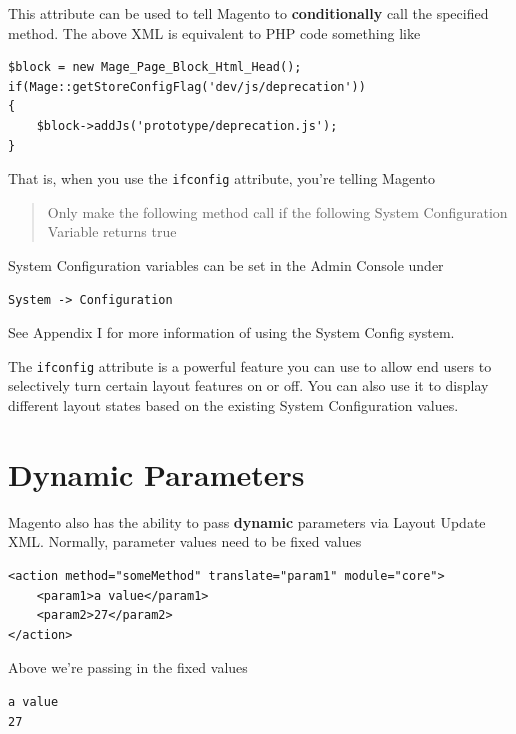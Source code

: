 \documentclass[oneside]{book}
\begin{document}
This attribute can be used to tell Magento to \textbf{conditionally} call the specified method. The above XML is equivalent to PHP code something like

\begin{lstlisting}
$block = new Mage_Page_Block_Html_Head();
if(Mage::getStoreConfigFlag('dev/js/deprecation'))
{
    $block->addJs('prototype/deprecation.js');
}

\end{lstlisting}


That is, when you use the \footnotesize\texttt{ifconfig} \normalsize  attribute, you're telling Magento

\begin{quote}
Only make the following method call if the following System Configuration Variable returns true
\end{quote}

System Configuration variables can be set in the Admin Console under

\begin{lstlisting}
System -> Configuration

\end{lstlisting}


See Appendix I for more information of using the System Config system.

The \footnotesize\texttt{ifconfig} \normalsize  attribute is a powerful feature you can use to allow end users to selectively turn certain layout features on or off.  You can also use it to display different layout states based on the existing System Configuration values.

\section{Dynamic Parameters}

Magento also has the ability to pass \textbf{dynamic} parameters via Layout Update XML.  Normally, parameter values need to be fixed values

\begin{lstlisting}
<action method="someMethod" translate="param1" module="core">
    <param1>a value</param1>
    <param2>27</param2>
</action>

\end{lstlisting}


Above we're passing in the fixed values

\begin{lstlisting}
a value
27

\end{lstlisting}
\end{document}
